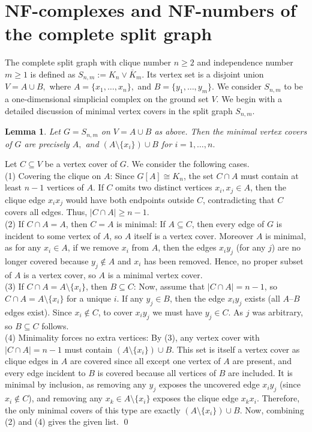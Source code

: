 \documentclass[12pt]{article}
\renewenvironment{proof}{{\noindent\bfseries Proof.}}{\qed}
\theoremstyle{plain}
\newtheorem{lemma}[theorem]{Lemma}
\theoremstyle{definition}
\begin{document}
	\section{NF-complexes and NF-numbers of the complete split graph}\label{section 4}
	  The complete split graph with clique number $n\geq 2$ and independence number $m\geq 1$ is defined as $S_{n,m} := K_n \vee \overline{K}_m$. Its vertex set is  a disjoint union $V = A\cup B,$ where $A=\{x_1,\dots,x_n\},$ and $B=\{y_1,\dots,y_m\}$. We consider $S_{n,m}$ to be a one-dimensional simplicial complex on the ground set $V$.	
	We begin with a detailed discussion of minimal vertex covers in the split graph $S_{n,m}$.	
	\begin{lemma}\label{lem:mincov-split}
		Let $G=S_{n,m}$ on $V=A\cup B$ as above.
		Then the minimal vertex covers of $G$ are precisely $A,$ and  $(A\setminus\{x_i\})\cup B $ for $ i=1,\dots,n.$
	\end{lemma}
	
	\begin{proof}
		Let $C\subseteq V$ be a vertex cover of $G$. We consider the following cases.\\		
		(1) Covering the clique on $A$:	Since $G[A]\cong K_n$, the set $C\cap A$ must contain at least $n-1$ vertices of $A$.	If $C$ omits two distinct vertices $x_i,x_j\in A$, then the clique edge $x_ix_j$	would have both endpoints outside $C$, contradicting that $C$ covers all edges. Thus,  $|C\cap A|\ge n-1$.\\
		(2) If $C\cap A=A$, then $C=A$ is minimal: If $A\subseteq C$, then every edge of $G$ is incident to some vertex of $A$,		so $A$ itself is a vertex cover. 		Moreover $A$ is  minimal, as for any $x_i\in A$, if we remove $x_i$ from $A$, then the edges $x_i y_j$
		(for any $j$) are no longer covered because $y_j\notin A$ and $x_i$ has been removed.
		Hence, no proper subset of $A$ is a vertex cover, so $A$ is a minimal vertex cover.\\
		(3) If $C\cap A=A\setminus\{x_i\}$, then $B\subseteq C$:		Now, assume that $|C\cap A|=n-1$, so $C\cap A=A\setminus\{x_i\}$ for a unique $i$.
		If any $y_j\in B$, then the edge $x_i y_j$ exists (all $A$--$B$ edges exist).
		Since $x_i\notin C$, to cover $x_i y_j$ we must have $y_j\in C$.
		As $j$ was arbitrary, so $B\subseteq C$ follows.\\
		 (4) Minimality forces no extra vertices:		By (3), any vertex cover with $|C\cap A|=n-1$ must contain
		$(A\setminus\{x_i\})\cup B$.
		This set is itself a vertex cover as clique edges in $A$ are covered since
		all except one vertex of $A$ are present, and every edge incident to $B$ is covered		because all vertices of $B$ are included.
		It is minimal by inclusion, as	removing any $y_j$ exposes the uncovered edge $x_i y_j$ (since $x_i\notin C$),
		and removing any $x_k\in A\setminus\{x_i\}$ exposes the clique edge $x_kx_i$.	Therefore, the only minimal covers of this type are exactly
		$(A\setminus\{x_i\})\cup B$. Now, combining (2) and (4) gives the given list.
	\end{proof}
	
\end{document}
